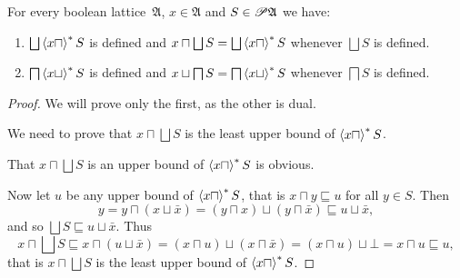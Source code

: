 \begin{thm}\label{bool-inf-distr1}
For every boolean lattice~$\mathfrak{A}$, $x\in\mathfrak{A}$ and $S\in\mathscr{P}\mathfrak{A}$ we have:
\begin{enumerate}
\item $\bigsqcup\rsupfun{x\sqcap}S$ is defined and $x\sqcap\bigsqcup S=\bigsqcup\rsupfun{x\sqcap}S$ whenever $\bigsqcup S$ is defined.
\item $\bigsqcap\left\langle x\sqcup\right\rangle ^{\ast}S$ is defined and $x\sqcup\bigsqcap S=\bigsqcap\left\langle x\sqcup\right\rangle ^{\ast}S$ whenever $\bigsqcap S$ is defined.
\end{enumerate}
\end{thm}

\begin{proof}
We will prove only the first, as the other is dual.

We need to prove that $x\sqcap\bigsqcup S$ is the least upper bound of $\left\langle x\sqcap\right\rangle ^{\ast}S$.

That $x\sqcap\bigsqcup S$ is an upper bound of $\left\langle x\sqcap\right\rangle ^{\ast}S$ is obvious.

Now let \textbf{$u$} be any upper bound of $\left\langle x\sqcap\right\rangle ^{\ast}S$,
that is $x\sqcap y\sqsubseteq u$ for all $y\in S$. Then
\[
y=y\sqcap(x\sqcup\bar{x})=(y\sqcap x)\sqcup(y\sqcap\bar{x})\sqsubseteq u\sqcup\bar{x},
\]
and so $\bigsqcup S\sqsubseteq u\sqcup\bar{x}$. Thus
\[
x\sqcap\bigsqcup S\sqsubseteq x\sqcap(u\sqcup\bar{x})=(x\sqcap u)\sqcup(x\sqcap\bar{x})=(x\sqcap u)\sqcup\bot=x\sqcap u\sqsubseteq u,
\]
that is $x\sqcap\bigsqcup S$ is the least upper bound of $\left\langle x\sqcap\right\rangle ^{\ast}S$.\end{proof}

